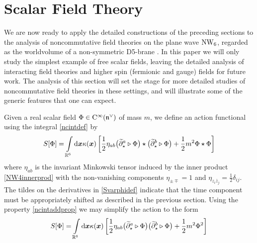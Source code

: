 \chapter{Scalar Field Theory}
\label{fieldtheory}

We are now ready to apply the detailed constructions of the preceding sections
to the analysis of noncommutative field theories on the plane wave $\operatorname{NW}_6$,
regarded as the worldvolume of a non-symmetric D5-brane \cite{KNSanjay1}. In
this paper we will only study the simplest example of free scalar fields,
leaving the detailed analysis of interacting field theories and higher spin
(fermionic and gauge) fields for future work. The analysis of this section will
set the stage for more detailed studies of noncommutative field theories in
these settings, and will illustrate some of the generic features that one can
expect.

Given a real scalar field $\Phi\in{\rm C}^\infty({\mathfrak n}^\vee)$ of mass $m$, we define
an action functional using the integral \eqref{ncintdef} by
\begin{equation}
  \label{Svarphidef}
  S[\Phi]=\int\limits_{{\mathbb R}^6} {\rm d}{\boldsymbol {x} } \kappa({\boldsymbol {x} }) \left[
    \frac12  \eta_{ab} \bigl( \widetilde
    {\partial}^{ a}_{\star}\triangleright\Phi\bigr)\star
    \bigl( \widetilde{\partial}^{ b}_{\star}\triangleright\Phi\bigr)+
    \frac12  m^2 \Phi\star\Phi\right]
\end{equation}
where $\eta_{ab}$ is the invariant Minkowski tensor induced by the inner product
\eqref{NW4innerprod} with the non-vanishing components $\eta_{\pm \mp}=1$ and
$\eta_{z_i \overline{z}_j}=\frac12 \delta_{ij}$. The tildes on the derivatives
in \eqref{Svarphidef} indicate that the time component must be appropriately
shifted as described in the previous section. Using the property
\eqref{ncintaddprop} we may simplify the action to the form
\begin{equation}
  \label{Svarphisimpl}
  S[\Phi]=\int\limits_{{\mathbb R}^6} {\rm d}{\boldsymbol {x} } \kappa({\boldsymbol {x} }) \left[
    \frac12  \eta_{ab} \bigl( \widetilde
    {\partial}^{ a}_{\star}\triangleright\Phi\bigr)
    \bigl( \widetilde{\partial}^{ b}_{\star}\triangleright\Phi\bigr)+
    \frac12  m^2 \Phi^2\right]
\end{equation}

